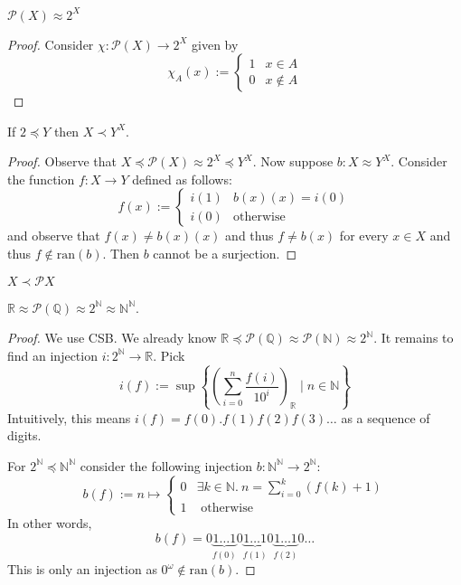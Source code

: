 \documentclass{whrartcl}
\newcommand{\NN}{\mathbb{N}}
\newcommand{\QQ}{\mathbb{Q}}
\newcommand{\RR}{\mathbb{R}}
\newcommand{\pow}{\mathcal{P}}
\newcommand{\ran}{\text{ran}}
\begin{document}
\begin{lemma}
  $\pow(X) \approx 2^X$
\end{lemma}
\begin{proof}
  Consider $\chi : \pow(X) \to 2^X$ given by
  \[
    \chi_A(x) :=
    \begin{cases}
      1 & x \in A \\
      0 & x \not\in A
    \end{cases}
  \]
\end{proof}

\begin{lemma}
  If $2 \preceq Y$ then $X \prec Y^X$.
\end{lemma}
\begin{proof}
  Observe that $X \preceq \pow(X) \approx 2^X \preceq Y^X$. Now suppose $b : X \approx
  Y^X$. Consider the function $f : X \to Y$ defined as follows:
  \[
    f(x) :=
    \begin{cases}
      i(1) & b(x)(x) = i(0) \\
      i(0) & \text{otherwise}
    \end{cases}
  \]
  and observe that $f(x) \neq b(x)(x)$ and thus $f \neq b(x)$ for every $x \in
  X$ and thus $f \not\in \ran(b)$. Then $b$ cannot be a surjection.
\end{proof}
\begin{corollary}
  $X \prec \pow{X}$
\end{corollary}

\begin{lemma}
  $\RR \approx \pow(\QQ) \approx 2^\NN \approx \NN^\NN$.
\end{lemma}
\begin{proof}
  We use CSB. We already know $\RR \preceq \pow(\QQ) \approx \pow(\NN) \approx
  2^\NN$. It remains to find an injection $i : 2^\NN \to \RR$. Pick
  \[
    i(f) := \sup \left\{\left(\sum_{i = 0}^n \frac{f(i)}{10^i}\right)_\RR \mid n \in \NN\right\}
  \]
  Intuitively, this means $i(f) = f(0).f(1)f(2)f(3)\ldots$ as a sequence of
  digits.

  For $2^\NN \preceq \NN^\NN$ consider the following injection $b : \NN^\NN \to
  2^\NN$:
  \[
    b(f) := n \mapsto
    \begin{cases}
      0 & \exists k \in \NN.~n = \sum_{i = 0}^k (f(k) + 1) \\
      1 & \text{ otherwise }
    \end{cases}
  \]
  In other words,
  \[
    b(f) = 0 \underbrace{1 \ldots 1}_{f(0)} 0 \underbrace{1 \ldots 1}_{f(1)} 0
    \underbrace{1 \ldots 1}_{f(2)} 0 \ldots
  \]
  This is only an injection as $0^\omega \not\in \ran(b)$.
\end{proof}
\end{document}
